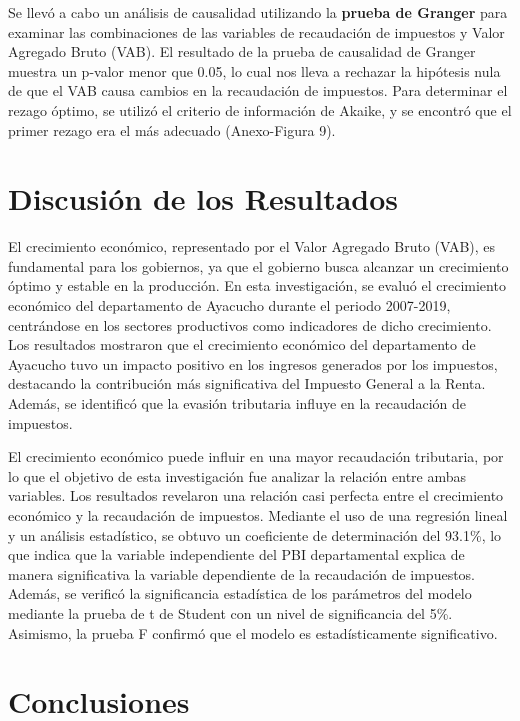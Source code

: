 \documentclass[
  letterpaper,
  DIV=11,
  numbers=noendperiod]{scrartcl}
\begin{document}
Se llevó a cabo un análisis de causalidad utilizando la \textbf{prueba
de Granger} para examinar las combinaciones de las variables de
recaudación de impuestos y Valor Agregado Bruto (VAB). El resultado de
la prueba de causalidad de Granger muestra un p-valor menor que 0.05, lo
cual nos lleva a rechazar la hipótesis nula de que el VAB causa cambios
en la recaudación de impuestos. Para determinar el rezago óptimo, se
utilizó el criterio de información de Akaike, y se encontró que el
primer rezago era el más adecuado (Anexo-Figura 9).

\hypertarget{discusiuxf3n-de-los-resultados}{%
\section{Discusión de los
Resultados}\label{discusiuxf3n-de-los-resultados}}

El crecimiento económico, representado por el Valor Agregado Bruto
(VAB), es fundamental para los gobiernos, ya que el gobierno busca
alcanzar un crecimiento óptimo y estable en la producción. En esta
investigación, se evaluó el crecimiento económico del departamento de
Ayacucho durante el periodo 2007-2019, centrándose en los sectores
productivos como indicadores de dicho crecimiento. Los resultados
mostraron que el crecimiento económico del departamento de Ayacucho tuvo
un impacto positivo en los ingresos generados por los impuestos,
destacando la contribución más significativa del Impuesto General a la
Renta. Además, se identificó que la evasión tributaria influye en la
recaudación de impuestos.

El crecimiento económico puede influir en una mayor recaudación
tributaria, por lo que el objetivo de esta investigación fue analizar la
relación entre ambas variables. Los resultados revelaron una relación
casi perfecta entre el crecimiento económico y la recaudación de
impuestos. Mediante el uso de una regresión lineal y un análisis
estadístico, se obtuvo un coeficiente de determinación del 93.1\%, lo
que indica que la variable independiente del PBI departamental explica
de manera significativa la variable dependiente de la recaudación de
impuestos. Además, se verificó la significancia estadística de los
parámetros del modelo mediante la prueba de t de Student con un nivel de
significancia del 5\%. Asimismo, la prueba F confirmó que el modelo es
estadísticamente significativo.

\hypertarget{conclusiones}{%
\section{Conclusiones}\label{conclusiones}}
\end{document}

